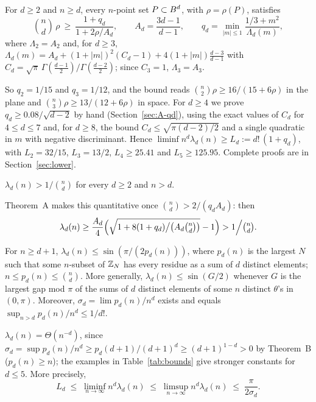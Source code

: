 \documentclass[11pt]{article}
\begin{document}
\begin{thmA}
For $d\ge2$ and $n\ge d$, every $n$-point set $P\subset B^d$, with $\rho=\rho(P)$, satisfies
\[
\binom nd\,\rho\ \ge\ \frac{1+q_d}{1+2\rho/A_d},\qquad A_d=\frac{3d-1}{d-1},\qquad
q_d=\min_{|m|\le1}\frac{1/3+m^2}{\Lambda_d(m)},
\]
where $\Lambda_2=A_2$ and, for $d\ge3$,
$\Lambda_d(m)=A_d+(1+|m|)^2(C_d-1)+4(1+|m|)\tfrac{d-3}{d-1}$
with $C_d=\sqrt\pi\,\Gamma(\tfrac{d-1}2)/\Gamma(\tfrac{d-2}2)$; since $C_3=1$, $\Lambda_3=A_3$.
\end{thmA}

So $q_2=1/15$ and $q_3=1/12$, and the bound reads $\binom n2\rho\ge 16/(15+6\rho)$ in the plane and
$\binom n3\rho\ge 13/(12+6\rho)$ in space. For $d\ge4$ we prove $q_d\ge0.08/\sqrt{d-2}$ by hand (Section~\ref{sec:A-qd}), using the exact
values of $C_d$ for $4\le d\le7$ and, for $d\ge8$, the bound $C_d\le\sqrt{\pi(d-2)/2}$ and a single quadratic in
$m$ with negative discriminant. Hence
$\liminf n^d\lambda_d(n)\ge L_d:=d!\,(1+q_d)$, with $L_2=32/15$, $L_3=13/2$, $L_4\ge25.41$ and
$L_5\ge125.95$. Complete proofs are in Section~\ref{sec:lower}.

\begin{corOne}
$\lambda_d(n)>1/\binom nd$ for every $d\ge2$ and $n>d$.
\end{corOne}

Theorem~A makes this quantitative once $\binom nd>2/(q_dA_d)$: then
\[
\lambda_d(n)\ge\frac{A_d}{4}\Bigl(\sqrt{1+8(1+q_d)\big/\bigl(A_d\tbinom nd\bigr)}-1\Bigr)>1\Big/\tbinom nd.
\]

\begin{thmB}
For $n\ge d+1$, $\lambda_d(n)\le\sin(\pi/(2p_d(n)))$, where $p_d(n)$ is the largest $N$ such that some
$n$-subset of $\mathbb{Z}_N$ has every residue as a sum of $d$ distinct elements; $n\le p_d(n)\le\binom nd$.
More generally, $\lambda_d(n)\le\sin(G/2)$ whenever $G$ is the largest gap mod $\pi$ of the sums of $d$
distinct elements of some $n$ distinct $\theta$'s in $(0,\pi)$. Moreover,
$\sigma_d=\lim p_d(n)/n^d$ exists and equals $\sup_{n>d}p_d(n)/n^d\le 1/d!$.
\end{thmB}

\begin{corC}
$\lambda_d(n)=\Theta(n^{-d})$, since $\sigma_d=\sup p_d(n)/n^d\ge p_d(d+1)/(d+1)^d\ge(d+1)^{1-d}>0$ by
Theorem~B ($p_d(n)\ge n$); the examples in Table~\ref{tab:bounds} give stronger constants for $d\le5$. More
precisely,
\[
L_d\;\le\;\liminf_{n\to\infty}n^d\lambda_d(n)\;\le\;\limsup_{n\to\infty}n^d\lambda_d(n)\;\le\;
\frac{\pi}{2\sigma_d}.
\]
\end{corC}
\end{document}
